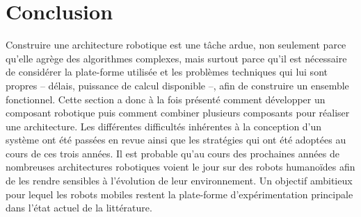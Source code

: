 \section{Conclusion}


Construire une architecture robotique est une tâche ardue, non
seulement parce qu'elle agrège des algorithmes complexes, mais surtout
parce qu'il est nécessaire de considérer la plate-forme utilisée et
les problèmes techniques qui lui sont propres -- délais, puissance de
calcul disponible --, afin de construire un ensemble
fonctionnel. Cette section a donc à la fois présenté comment
développer un composant robotique puis comment combiner plusieurs
composants pour réaliser une architecture. Les différentes difficultés
inhérentes à la conception d'un système ont été passées en revue ainsi
que les stratégies qui ont été adoptées au cours de ces trois
années. Il est probable qu'au cours des prochaines années de
nombreuses architectures robotiques voient le jour sur des robots
humanoïdes afin de les rendre sensibles à l'évolution de leur
environnement. Un objectif ambitieux pour lequel les robots mobiles
restent la plate-forme d'expérimentation principale dans l'état actuel
de la littérature.


